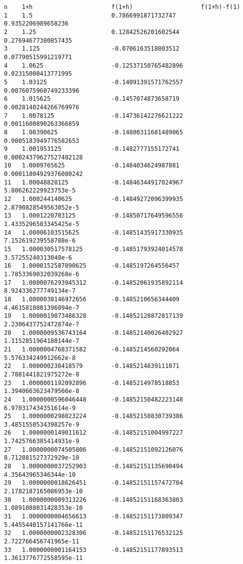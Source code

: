 \documentclass{article}
\begin{document}
\begin{verbatim}
n    1+h                      f(1+h)                   f(1+h)-f(1)
1    1.5                      0.7866991871732747       0.9352206989658236       
2    1.25                     0.12842526201602544      0.27694677380857435
3    1.125                    -0.0706163518803512      0.07790515991219771
4    1.0625                   -0.12537150765482896     0.02315000413771995
5    1.03125                  -0.14091391571762557     0.0076075960749233396
6    1.015625                 -0.1457074873658719      0.0028140244266769976
7    1.0078125                -0.14736142276621222     0.0011600890263366859
8    1.00390625               -0.14800311681489065     0.0005183949776582653
9    1.001953125              -0.1482777155172741      0.00024379627527482128
10   1.0009765625             -0.1484034624987881      0.00011804929376080242
11   1.00048828125            -0.14846344917024967     5.806262229923753e-5
12   1.000244140625           -0.14849272096399935     2.8790828549563052e-5
13   1.0001220703125          -0.14850717649596556     1.4335296583345425e-5
14   1.00006103515625         -0.14851435917330935     7.152619239558788e-6
15   1.000030517578125        -0.14851793924014578     3.57255240313048e-6
16   1.0000152587890625       -0.1485197264556457      1.7853369032039268e-6
17   1.0000076293945312       -0.14852061935892114     8.924336277749134e-7
18   1.0000038146972656       -0.1485210656344409      4.4615810801396094e-7
19   1.0000019073486328       -0.14852128872817139     2.2306437752472874e-7
20   1.0000009536743164       -0.14852140026402927     1.1152851964180144e-7
21   1.0000004768371582       -0.1485214560292064      5.576334249912662e-8
22   1.000000238418579        -0.1485214839111071      2.7881441821975272e-8
23   1.0000001192092896       -0.1485214978518853      1.3940663623479566e-8
24   1.0000000596046448       -0.14852150482223148     6.970317434351614e-9
25   1.0000000298023224       -0.14852150830739386     3.4851550534398257e-9
26   1.0000000149011612       -0.14852151004997227     1.7425766385414931e-9
27   1.0000000074505806       -0.14852151092126076     8.712881527372929e-10
28   1.0000000037252903       -0.14852151135690494     4.35643965346344e-10
29   1.0000000018626451       -0.14852151157472704     2.1782187165086953e-10
30   1.0000000009313226       -0.14852151168363803     1.0891088031428353e-10
31   1.0000000004656613       -0.14852151173809347     5.4455440157141766e-11
32   1.0000000002328306       -0.14852151176532125     2.722766456741965e-11
33   1.0000000001164153       -0.14852151177893513     1.3613776772558595e-11

\end{verbatim}
\end{document}
